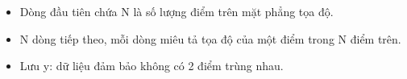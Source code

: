 \begin{itemize}
	\item Dòng đầu tiên chứa N là số lượng điểm trên mặt phẳng tọa độ.
	\item N dòng tiếp theo, mỗi dòng miêu tả tọa độ của một điểm trong N điểm trên.
	\item Lưu y: dữ liệu đảm bảo không có 2 điểm trùng nhau.
\end{itemize}